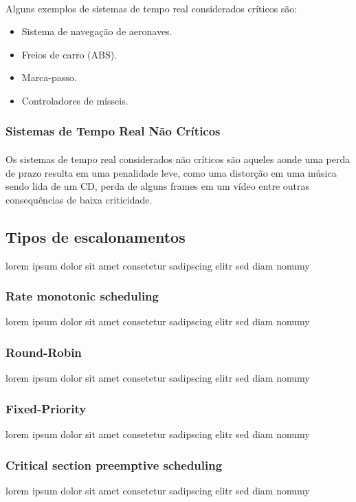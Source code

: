 \paragraph{}
Alguns exemplos de sistemas de tempo real considerados críticos são:
\begin{itemize}
\item Sistema de navegação de aeronaves.
\item Freios de carro (ABS).
\item Marca-passo.
\item Controladores de mísseis.
\end{itemize}

\subsubsection{Sistemas de Tempo Real Não Críticos}
\paragraph{}
Os sistemas de tempo real considerados não críticos são aqueles aonde uma perda de prazo
resulta em uma penalidade leve, como uma distorção em uma música sendo lida de um CD, perda
de alguns frames em um vídeo entre outras consequências de baixa criticidade.


\subsection{Tipos de escalonamentos}
lorem ipsum dolor sit amet consetetur sadipscing elitr sed diam nonumy

\subsubsection{Rate monotonic scheduling}
lorem ipsum dolor sit amet consetetur sadipscing elitr sed diam nonumy

\subsubsection{Round-Robin}
lorem ipsum dolor sit amet consetetur sadipscing elitr sed diam nonumy

\subsubsection{Fixed-Priority}
lorem ipsum dolor sit amet consetetur sadipscing elitr sed diam nonumy

\subsubsection{Critical section preemptive scheduling}
lorem ipsum dolor sit amet consetetur sadipscing elitr sed diam nonumy


